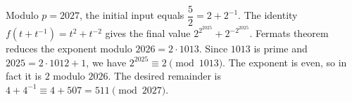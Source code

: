 Modulo $p=2027$, the initial input equals $\dfrac{5}{2}=2+2^{-1}$. The identity $f(t+t^{-1})=t^2+t^{-2}$ gives the final value $2^{2^{2025}}+2^{-2^{2025}}$. Fermat\textquotesingle s theorem reduces the exponent modulo $2026=2\cdot1013$. Since $1013$ is prime and $2025=2\cdot1012+1$, we have $2^{2025}\equiv2\pmod{1013}$. The exponent is even, so in fact it is $2$ modulo $2026$. The desired remainder is $4+4^{-1}\equiv4+507=\boxed{511}\pmod{2027}$.
